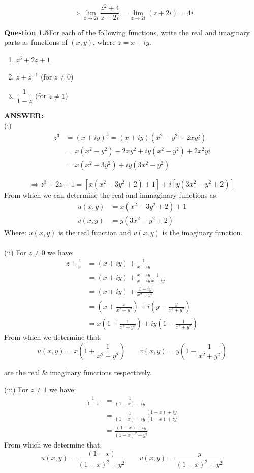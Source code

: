 \documentclass[12pt,a4paper]{article}
\newcommand{\answer}{\vspace{3\baselineskip}\textbf{ANSWER:}}
\newcommand{\question}[2]{\textbf{Question #1}\quad #2}
\begin{document}
\[
\Rightarrow
\lim_{z\to 2i}\frac{z^2+4}{z-2i}
=
\lim_{z\to 2i}(z+2i)
=
4i
\]

\newpage

\question{1.5}{For each of the following functions, write the real and imaginary parts as functions of $(x,y)$, where $z=x+iy$.

\begin{enumerate}
\item[(i)] $z^3+2z+1$
\item[(ii)] $z+z^{-1}$ (for $z\neq 0$)
\item[(iii)] $\dfrac{1}{1-z}$ (for $z\neq 1$)
\end{enumerate}
}

\answer \\
(i)
\[
\begin{aligned}
z^3 &= (x+iy)^3=(x+iy)(x^2-y^2+2xyi) \\
    &= x(x^2-y^2)-2xy^2+iy(x^2-y^2)+2x^2yi \\
    &= x(x^2-3y^2)+iy(3x^2-y^2)
\end{aligned}
\]

\[
\Rightarrow z^3+2z+1
=
\left[x(x^2-3y^2+2)+1\right]
+i\left[y(3x^2-y^2+2)\right]
\]
From which we can determine the real and immaginary functions as:
\[
\begin{aligned}
u(x,y) &= x(x^2-3y^2+2)+1 \\
v(x,y) &= y(3x^2-y^2+2)
\end{aligned}
\]
Where: $u(x,y)$ is the real function and $v(x,y)$ is the imaginary function.\\
\\
(ii) For $z \ne 0$ we have:
\[
\begin{aligned}
z + \frac{1}{z} &= (x+iy) + \frac{1}{x+iy} \\
 &= (x + iy) + \frac{x-iy}{x-iy}\frac{1}{x+iy} \\
 &= (x + iy) +\frac{x-iy}{x^2+y^2} \\
 &= (x + \frac{x}{x^2+y^2}) + i (y - \frac{y}{x^2+y^2}) \\
 &= x(1 + \frac{1}{x^2+y^2}) + i y(1 - \frac{1}{x^2+y^2})
 \end{aligned}
\]
From which we determine that:
\[
u(x,y)=x(1 + \frac{1}{x^2+y^2})
\qquad
v(x,y)=y(1 - \frac{1}{x^2+y^2})
\]

are the real \& imaginary functions respectively.

\newpage
(iii) For $z \ne 1$ we have:
\[
\begin{aligned}
\frac{1}{1-z} &= \frac{1}{(1-x) - iy} \\
    &= \frac{1}{(1-x) - iy} \frac{(1-x) + i y}{(1-x) + i y} \\
    &= \frac{(1-x) + i y}{(1-x)^2 + y^2}
\end{aligned}
\]
From which we determine that:
\[
u(x,y)=\frac{(1-x)}{(1-x)^2 + y^2}
\qquad
v(x,y)= \frac{y}{(1-x)^2 + y^2}
\]
\end{document}
